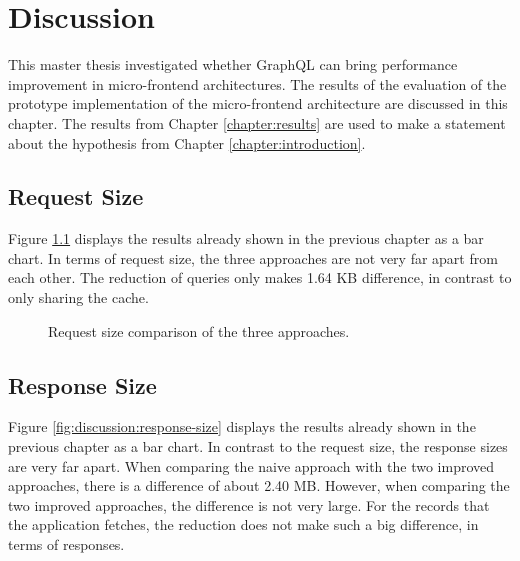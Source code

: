 \chapter{Discussion}\label{chapter:discussion}

This master thesis investigated whether GraphQL can bring performance improvement in micro-frontend architectures. The results of the evaluation of the prototype implementation of the micro-frontend architecture are discussed in this chapter. The results from Chapter \ref{chapter:results} are used to make a statement about the hypothesis from Chapter \ref{chapter:introduction}.


\section{Request Size}

Figure \ref{fig:discussion:request-size} displays the results already shown in the previous chapter as a bar chart. In terms of request size, the three approaches are not very far apart from each other. The reduction of queries only makes 1.64 KB difference, in contrast to only sharing the cache.

\begin{figure}[H]
  \centering
  \caption{Request size comparison of the three approaches.}\label{fig:discussion:request-size}
\end{figure}

\section{Response Size}

Figure \ref{fig:discussion:response-size} displays the results already shown in the previous chapter as a bar chart. In contrast to the request size, the response sizes are very far apart. When comparing the naive approach with the two improved approaches, there is a difference of about 2.40 MB. However, when comparing the two improved approaches, the difference is not very large. For the records that the application fetches, the reduction does not make such a big difference, in terms of responses. 

